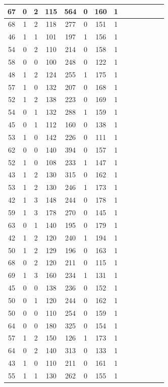 \documentclass{article}
\begin{document}
\begin{center}
\begin{longtable}{|c|c|c|c|c|c|c|c|c|c|c|c|c|c|}
\hline
67 & 0 & 2 & 115 & 564 & 0 & 160 & 1 \\
\hline
68 & 1 & 2 & 118 & 277 & 0 & 151 & 1 \\
\hline
46 & 1 & 1 & 101 & 197 & 1 & 156 & 1 \\
\hline
54 & 0 & 2 & 110 & 214 & 0 & 158 & 1 \\
\hline
58 & 0 & 0 & 100 & 248 & 0 & 122 & 1 \\
\hline
48 & 1 & 2 & 124 & 255 & 1 & 175 & 1 \\
\hline
57 & 1 & 0 & 132 & 207 & 0 & 168 & 1 \\
\hline
52 & 1 & 2 & 138 & 223 & 0 & 169 & 1 \\
\hline
54 & 0 & 1 & 132 & 288 & 1 & 159 & 1 \\
\hline
45 & 0 & 1 & 112 & 160 & 0 & 138 & 1 \\
\hline
53 & 1 & 0 & 142 & 226 & 0 & 111 & 1 \\
\hline
62 & 0 & 0 & 140 & 394 & 0 & 157 & 1 \\
\hline
52 & 1 & 0 & 108 & 233 & 1 & 147 & 1 \\
\hline
43 & 1 & 2 & 130 & 315 & 0 & 162 & 1 \\
\hline
53 & 1 & 2 & 130 & 246 & 1 & 173 & 1 \\
\hline
42 & 1 & 3 & 148 & 244 & 0 & 178 & 1 \\
\hline
59 & 1 & 3 & 178 & 270 & 0 & 145 & 1 \\
\hline
63 & 0 & 1 & 140 & 195 & 0 & 179 & 1 \\
\hline
42 & 1 & 2 & 120 & 240 & 1 & 194 & 1 \\
\hline
50 & 1 & 2 & 129 & 196 & 0 & 163 & 1 \\
\hline
68 & 0 & 2 & 120 & 211 & 0 & 115 & 1 \\
\hline
69 & 1 & 3 & 160 & 234 & 1 & 131 & 1 \\
\hline
45 & 0 & 0 & 138 & 236 & 0 & 152 & 1 \\
\hline
50 & 0 & 1 & 120 & 244 & 0 & 162 & 1 \\
\hline
50 & 0 & 0 & 110 & 254 & 0 & 159 & 1 \\
\hline
64 & 0 & 0 & 180 & 325 & 0 & 154 & 1 \\
\hline
57 & 1 & 2 & 150 & 126 & 1 & 173 & 1 \\
\hline
64 & 0 & 2 & 140 & 313 & 0 & 133 & 1 \\
\hline
43 & 1 & 0 & 110 & 211 & 0 & 161 & 1 \\
\hline
55 & 1 & 1 & 130 & 262 & 0 & 155 & 1 \\

\end{longtable}
\end{center}
\end{document}
